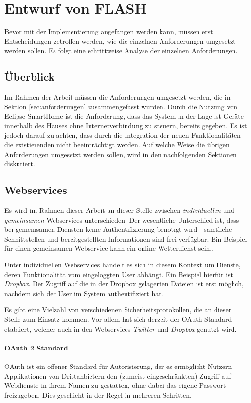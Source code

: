 \chapter{Entwurf von FLASH}
\label{chap:entwurf}
Bevor mit der Implementierung angefangen werden kann, müssen erst Entscheidungen
getroffen werden, wie die einzelnen Anforderungen umgesetzt werden sollen. Es folgt eine
schrittweise Analyse der einzelnen Anforderungen.

\section{Überblick}
Im Rahmen der Arbeit müssen die Anforderungen umgesetzt werden, die in Sektion \ref{sec:anforderungen} zusammengefasst wurden. Durch die Nutzung von Eclipse SmartHome ist die Anforderung, dass das System in der Lage ist Geräte innerhalb des Hauses ohne Internetverbindung zu steuern, bereits gegeben. Es ist jedoch darauf zu achten, dass durch die Integration der neuen Funktionalitäten die existierenden nicht beeinträchtigt werden.
Auf welche Weise die übrigen Anforderungen umgesetzt werden sollen, wird in den nachfolgenden Sektionen diskutiert.


\section{Webservices}
Es wird im Rahmen dieser Arbeit an dieser Stelle zwischen \textit{individuellen} und \textit{gemeinsamen} Webservices unterschieden. Der wesentliche Unterschied ist, dass bei gemeinsamen Diensten keine Authentifizierung benötigt wird - sämtliche Schnittstellen und bereitgestellten Informationen sind frei verfügbar. Ein Beispiel für einen gemeinsamen Webservice kann ein online Wetterdienst sein.. 

Unter individuellen Webservices handelt es sich in diesem Kontext um Dienste, deren Funktionalität vom eingeloggten User abhängt. Ein Beispiel hierfür ist \textit{Dropbox}. Der Zugriff auf die in der Dropbox gelagerten Dateien ist erst möglich, nachdem sich der User im System authentifiziert hat. 

Es gibt eine Vielzahl von verschiedenen Sicherheitsprotokollen, die an dieser Stelle zum Einsatz kommen. Vor allem hat sich derzeit der OAuth Standard etabliert, welcher auch in den Webservices \textit{Twitter} und \textit{Dropbox} genutzt wird.\\

\subsubsection{OAuth 2 Standard}
\label{subsubsec:oauth}
OAuth\cite{oauth} ist ein offener Standard für Autorisierung, der es ermöglicht Nutzern Applikationen von Drittanbietern den (zumeist eingeschränkten) Zugriff auf Webdienste in ihrem Namen zu gestatten, ohne dabei das eigene Passwort freizugeben. Dies geschieht in der Regel in mehreren Schritten.

